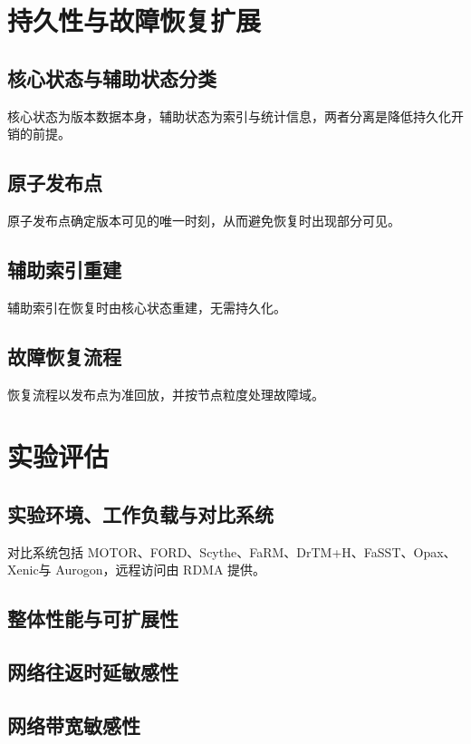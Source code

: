 \section{持久性与故障恢复扩展}
\subsection{核心状态与辅助状态分类}
核心状态为版本数据本身，辅助状态为索引与统计信息，两者分离是降低持久化开销的前提\cite{correiaRomulus2018,zhangFord2022}。
\subsection{原子发布点}
原子发布点确定版本可见的唯一时刻，从而避免恢复时出现部分可见\cite{luScythe2024,zhangFord2022}。
\subsection{辅助索引重建}
辅助索引在恢复时由核心状态重建，无需持久化\cite{assaTl4x2023}。
\subsection{故障恢复流程}
恢复流程以发布点为准回放，并按节点粒度处理故障域\cite{zhangFord2022,luScythe2024}。

\section{实验评估}
\subsection{实验环境、工作负载与对比系统}
对比系统包括 MOTOR\cite{zhangMotor2024}、FORD\cite{zhangFord2022}、Scythe\cite{luScythe2024}、FaRM\cite{dragojevicFarm2014}、DrTM+H\cite{chenFast2016}、FaSST\cite{kaliaFasst2016}、Opax\cite{shamisFast2019}、Xenic\cite{schuhXenic2021}与 Aurogon\cite{jiangAurogon2022}，远程访问由 RDMA 提供\cite{kaliaUsing2014,kaliaDesign2016,guoRdma2016}。
\subsection{整体性能与可扩展性}
\subsection{网络往返时延敏感性}
\subsection{网络带宽敏感性}
